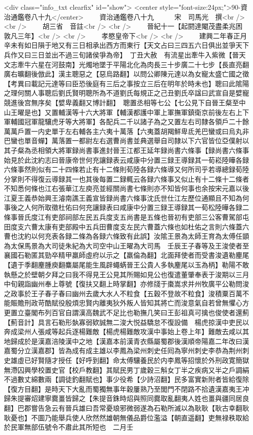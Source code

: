 <div class="info_txt clearfix" id="show">
<center style="font-size:24px;">90-資治通鑑卷八十九</center>
  　　資治通鑑卷八十九　　　宋　司馬光　撰<br />
<br />
　　胡三省　音註<br />
<br />
　　晉紀十一【起閼達閹茂盡柔兆困敦凡三年】<br />
<br />
　　孝愍皇帝下<br />
<br />
　　建興二年春正月辛未有如日隕于地又有三日相承出西方而東行【天文占曰三四五六日俱出並爭天下兵作又曰三日並出不過三旬諸侯爭為帝】　丁丑大赦　有流星出牽牛入紫微【晉天文志牽牛六星在河鼓南】光燭地墜于平陽北化為肉長三十步廣二十七步【長直亮翻廣右曠翻後倣此】漢主聰惡之【惡烏路翻】以問公卿陳元達以為女寵太盛亡國之徵　【考異曰載記元達等曰臣恐後庭有三后之事按立三后在明年於時未也】聰曰此隂陽之理何關人事聰后劉氏賢明聰所為不道劉氏每規正之己丑劉氏卒諡曰武宣自是嬖寵競進後宫無序矣【嬖卑義翻又博計翻】　聰置丞相等七公【七公見下自晉王粲至中山王曜是也】又置輔漢等十六大將軍【輔漢都護中軍上軍撫軍鎮衛京前後左右上下軍輔國冠軍龍驤虎牙等大將軍】各配兵二千以諸子為之又置左右司隸各領戶二十餘萬萬戶置一内史單于左右輔各主六夷十萬落【六夷蓋胡羯鮮卑氐羌巴蠻或曰烏丸非巴蠻也單音蟬】萬落置一都尉左右選曹尚書並典選舉自司隸以下六官皆位亞僕射以其子粲為丞相領大將軍録尚書事進封晉王江都王延年録尚書六條事【録尚書六條事始見於此沈約志曰晉康帝世何充讓録表云咸康中分置三録王導録其一荀崧陸曄各録六條事然則似有二十四條若止有十二條則荀陸各録六條導又何所司乎若導總録荀陸分掌則不得復云導録其一也其後每置二録輒云各録六條事又似止有十二條十二條者不知悉何條也江右張華江左庾亮並經關尚書七條則亦不知皆何事也余按宋元嘉以後江夏王義恭始興王濬南譙王義宣皆録尚書六條事沈氏世仕江左歷位通顯且不知為何事後之人何所取徵杜佑曰何充讓録表曰咸康中分置三録王導録其一荀松陸曄各録二條事晉氏度江有吏部祠部左民五兵度支五尚書是五條也晉初有吏部三公客曹駕部屯田度支六曹太康有吏部殿中五兵田曹度支左民六曹蓋六條也如杜佑之言則六條蓋六曹也沈約以何充表各録二條為各録六條致有此誤】汝隂王景為太師王育為太傅任顗為太保馬景為大司徒朱紀為大司空中山王曜為大司馬　壬辰王子春等及王浚使者至襄國石勒匿其勁卒精甲羸師虛府以示之【羸倫為翻】北面拜使者而受書浚遺勒麈尾【遺于季翻麈腫庾翻麋屬尾能生風辟蠅蜹晉王公貴人多執麈尾以玉為柄】勒陽不敢執懸之於壁朝夕拜之曰我不得見王公見其所賜如見公也復遣董肇奉表于浚期以三月中旬親詣幽州奉上尊號【復扶又翻上時掌翻】亦修牋于棗嵩求并州牧廣平公勒問浚之政事於王子春子春曰幽州去歲大水人不粒食【五穀不登故不粒食】浚積粟百萬不能賑贍刑政苛酷賦役殷煩忠賢内離夷狄外叛人皆知其將亡而浚意氣自若曾無懼心方更置立臺閣布列百官自謂漢高魏武不足比也勒撫几笑曰王彭祖真可擒也俊使者還薊【薊音計】具言石勒形埶寡弱欵誠無二浚大悦益驕怠不復設備　楊虎掠漢中吏民以奔成梁州人張咸等起兵逐楊難敵【楊虎楊難敵攻漢中事始上卷上年】難敵去咸以其地歸成於是漢嘉涪陵漢中之地【漢嘉本前漢青衣縣屬蜀郡後漢順帝陽嘉二年改曰漢嘉蜀分立漢嘉郡】皆為成有成主雄以李鳳為梁州刺史任囘為寧州刺史李恭為荆州刺史雄虛已好賢隨才授任【好呼到翻】命太傅驤養民於内李鳳等招懷於外刑政寛簡獄無滯囚興學校置史官【校戶教翻】其賦民男丁歲穀三斛女丁半之疾病又半之戶調絹不過數丈綿數兩【調徒釣翻賦也】事少役希【少詩沼翻】民多富實新附者皆給復除【復方目翻】是時天下大亂而蜀獨無事年穀屢熟乃至閭門不閉路不拾遺漢嘉夷王冲歸朱提審炤建寧爨畺皆歸之【朱提音銖時炤與照同爨取亂翻夷人姓也畺與疆同居良翻】巴郡嘗告急云有晉兵雄曰吾常憂琅邪微弱遂為石勒所滅以為耿耿【耿古幸翻耿耿憂也】不圖乃能舉兵使人欣然然雄朝無儀品爵位濫溢【朝直遥翻】吏無禄秩取給於民軍無部伍號令不肅此其所短也　二月壬